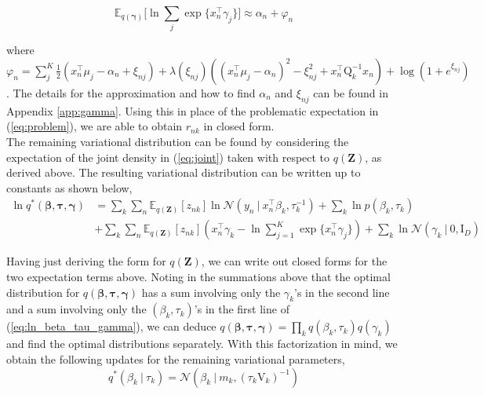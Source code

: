 \documentclass[twoside,11pt]{article}
\newcommand{\tr}{\intercal}
\newcommand{\eye}{\mathrm{I}}
\newcommand\given[1][]{\:#1\vert\:}
\newcommand{\transpose}[1]{#1^{\intercal}}
\newcommand{\kprod}{\prod_{k}}
\newcommand{\nsum}{\sum_{n}}
\newcommand{\ksum}{\sum_{k}}
\newcommand{\boldbeta}{\boldsymbol\beta}
\newcommand{\boldgamma}{\boldsymbol\gamma}
\newcommand{\boldtau}{\boldsymbol\tau}
\newcommand{\sumexp}{\sum_{j=1}^{K} \exp \{ \transpose{x_n} \gamma_j \}}
\newcommand{\E}{\mathbb{E}}
\newcommand{\pr}[1]{p \left( #1 \right)}
\begin{document}
\begin{equation} \label{eq:bouchard_approx}
	\E_{q(\boldsymbol\gamma)}\big[\ln \sum_{j} \exp \{ x_n^{\tr} \gamma_j \} \big] \approx \alpha_n + \varphi_n
\end{equation}

where $\varphi_n =  \sum_{j}^K \frac{1}{2}\left(x_n^{\tr}\mu_j - \alpha_n + \xi_{nj}\right) + \lambda(\xi_{nj}) \left( (x_n^{\tr} \mu_j - \alpha_n)^2 - \xi_{nj}^2 + x_n^{\tr} \mathrm{Q}_k^{-1} x_n \right) + \log( 1 + e^{\xi_{nj}})$. The details for the approximation and how to find $\alpha_n$ and $\xi_{nj}$ can be found in Appendix \ref{app:gamma}. Using this in place of the problematic expectation in (\ref{eq:problem}), we are able to obtain $r_{nk}$ in closed form. \\

The remaining variational distribution can be found by considering the expectation of the joint density in (\ref{eq:joint}) taken with respect to $q(\mathbf{Z})$, as derived above. The resulting variational distribution can be written up to constants as shown below,
\begin{equation} \label{eq:ln_beta_tau_gamma}
\begin{split}
	\ln q^{*}(\boldbeta, \boldtau, \boldgamma) &=  \ksum \nsum  \E_{q(\mathbf{Z})}[z_{nk}] \ln \mathcal{N} \left( y_n \given \transpose{x_n} \beta_k, \tau_{k}^{-1} \right) + \ksum \ln \pr{\beta_k, \tau_k} \\
	& + \ksum \nsum \E_{q(\mathbf{Z})}[z_{nk}] \left( \transpose{x_n} \gamma_k - \ln  \sumexp \right) + \ksum \ln \mathcal{N}(\gamma_k \given 0, \eye_D)
\end{split}
\end{equation}

Having just deriving the form for $q(\mathbf{Z})$, we can write out closed forms for the two expectation terms above. Noting in the summations above that the optimal distribution for $q(\boldbeta, \boldtau, \boldgamma)$ has a sum involving only the $\gamma_k$'s in the second line and a sum involving only the $(\beta_k, \tau_k)$'s in the first line of (\ref{eq:ln_beta_tau_gamma}), we can deduce $q(\boldbeta, \boldtau, \boldgamma) = \kprod q(\beta_k, \tau_k) q(\gamma_k)$ and find the optimal distributions separately. With this factorization in mind, we obtain the following updates for the remaining variational parameters,
\begin{equation} \label{optimal_beta_given_tau}
	q^{*}(\beta_k \given \tau_k) = \mathcal{N}\left(\beta_k \given m_k, (\tau_k \mathrm{V}_k)^{-1} \right)
\end{equation}
\end{document}
